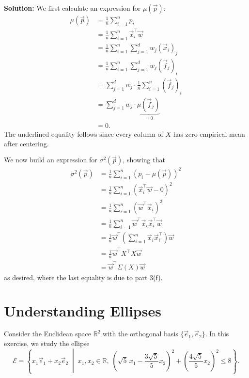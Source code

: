 \documentclass[10pt]{article}
\theoremstyle{definition}
\theoremstyle{plain}
\newcommand{\RR}{\mathbb{R}}
\begin{document}
\begin{enumerate}[label=(\alph*)]
\textbf{Solution:} We first calculate an expression for $\mu(\vec{p})$:
\begin{align}
\mu(\vec{p}) &= \frac{1}{n} \sum_{i=1}^{n} p_i \\
&= \frac{1}{n} \sum_{i=1}^{n} \vec{x}_i^\top \vec{w} \\
&= \frac{1}{n} \sum_{i=1}^{n} \sum_{j=1}^{d} w_j (\vec{x}_i)_j \\
&= \frac{1}{n} \sum_{i=1}^{n} \sum_{j=1}^{d} w_j (\vec{f}_j)_i \\
&= \sum_{j=1}^{d} w_j \cdot \frac{1}{n} \sum_{i=1}^{n} (\vec{f}_j)_i \\
&= \sum_{j=1}^{d} w_j \cdot \underbrace{\mu(\vec{f}_j)}_{=0} \\
&= 0.
\end{align}
The underlined equality follows since every column of $X$ has zero empirical mean after centering.

We now build an expression for $\sigma^2(\vec{p})$, showing that
\begin{align}
\sigma^2(\vec{p}) &= \frac{1}{n} \sum_{i=1}^{n} (p_i - \mu(\vec{p}))^2 \\
&= \frac{1}{n} \sum_{i=1}^{n} (\vec{x}_i^\top \vec{w} - 0)^2 \\
&= \frac{1}{n} \sum_{i=1}^{n} (\vec{w}^\top \vec{x}_i)^2 \\
&= \frac{1}{n} \sum_{i=1}^{n} \vec{w}^\top \vec{x}_i \vec{x}_i^\top \vec{w} \\
&= \frac{1}{n} \vec{w}^\top \left( \sum_{i=1}^{n} \vec{x}_i \vec{x}_i^\top \right) \vec{w} \\
&= \frac{1}{n} \vec{w}^\top X^\top X \vec{w} \\
&= \vec{w}^\top \Sigma(X) \vec{w}
\end{align}
as desired, where the last equality is due to part 3(f).
\end{enumerate}

\section{Understanding Ellipses}

Consider the Euclidean space $\RR^2$ with the orthogonal basis $\{\vec{e}_1, \vec{e}_2\}$. In this exercise, we study the ellipse
\begin{equation}
\mathcal{E} = \left\{ x_1 \vec{e}_1 + x_2 \vec{e}_2 \;\middle|\; x_1, x_2 \in \RR,\; \left( \sqrt{5}\, x_1 - \frac{3\sqrt{5}}{5} x_2 \right)^2 + \left( \frac{4\sqrt{5}}{5} x_2 \right)^2 \leq 8 \right\}.
\end{equation}
\end{document}
